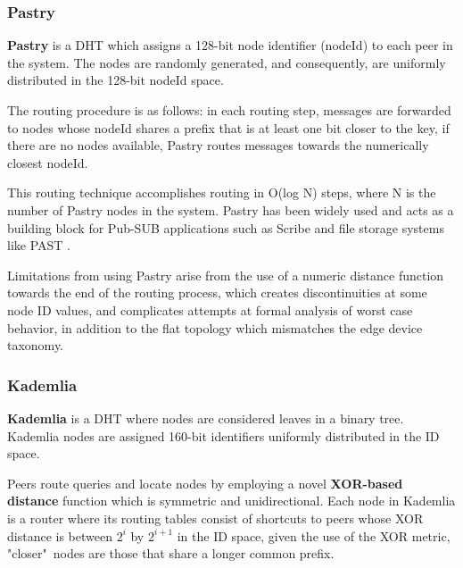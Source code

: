 
\subsubsection*{Pastry}

\textbf{Pastry} \cite{rowstron2001pastry} is a DHT which assigns a 128-bit node identifier (nodeId) to each peer in the system. The nodes are randomly generated, and consequently, are uniformly distributed in the 128-bit nodeId space. 

The routing procedure is as follows: in each routing step, messages are forwarded to nodes whose nodeId shares a prefix that is at least one bit closer to the key, if there are no nodes available, Pastry routes messages towards the numerically closest nodeId. 

This routing technique accomplishes routing in O(log N) steps, where N is the number of Pastry nodes in the system. Pastry has been widely used and acts as a building block for Pub-SUB applications such as Scribe \cite{10.1007/3-540-45546-9_3} and file storage systems like PAST \cite{990064}. 

Limitations from using Pastry arise from the use of a numeric distance function towards the end of the routing process, which creates discontinuities at some node ID values, and complicates attempts at formal analysis of worst case behavior, in addition to the flat topology which mismatches the edge device taxonomy.

\subsubsection*{Kademlia}

\textbf{Kademlia} \cite{maymounkov2002kademlia} is a DHT where nodes are considered leaves in a binary tree. Kademlia nodes are assigned 160-bit identifiers uniformly distributed in the ID space.

Peers route queries and locate nodes by employing a novel \textbf{XOR-based distance} function which is symmetric and unidirectional. Each node in Kademlia is a router where its routing tables consist of shortcuts to peers whose XOR distance is between \(2^{i}\) by \(2^{i + 1}\) in the ID space, given the use of the XOR metric, "closer"\ nodes are those that share a longer common prefix.

